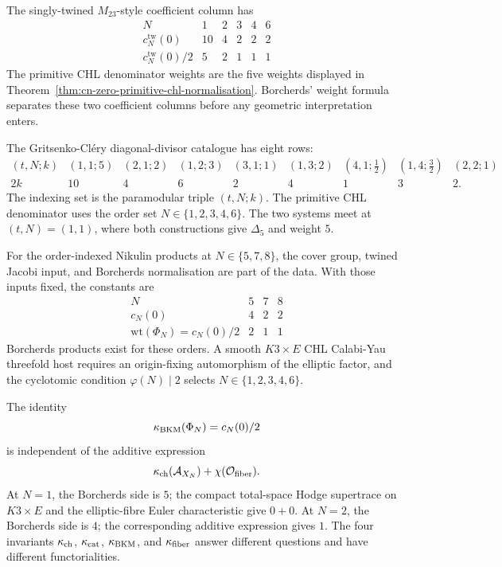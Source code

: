 \begin{remark}
\label{rem:cn-zero-coefficient-conventions-separated}
The singly-twined \(M_{23}\)-style coefficient column has
\[
\begin{array}{c|ccccc}
N & 1 & 2 & 3 & 4 & 6 \\ \hline
c_N^{\mathrm{tw}}(0) & 10 & 4 & 2 & 2 & 2 \\
c_N^{\mathrm{tw}}(0)/2 & 5 & 2 & 1 & 1 & 1
\end{array}
\]
The primitive CHL denominator weights are the five weights displayed in
Theorem~\ref{thm:cn-zero-primitive-chl-normalisation}.  Borcherds'
weight formula separates these two coefficient columns before any
geometric interpretation enters.

The Gritsenko-Cl\'ery diagonal-divisor catalogue has eight rows:
\[
\begin{array}{c|cccccccc}
(t,N;k) &
(1,1;5)&(2,1;2)&(1,2;3)&(3,1;1)&
(1,3;2)&(4,1;\tfrac12)&(1,4;\tfrac32)&(2,2;1)\\ \hline
2k & 10&4&6&2&4&1&3&2 .
\end{array}
\]
The indexing set is the paramodular triple \((t,N;k)\).  The primitive
CHL denominator uses the order set \(N\in\{1,2,3,4,6\}\).  The two
systems meet at \((t,N)=(1,1)\), where both constructions give
\(\Delta_5\) and weight \(5\).

For the order-indexed Nikulin products at \(N\in\{5,7,8\}\), the cover
group, twined Jacobi input, and Borcherds normalisation are part of the
data.  With those inputs fixed, the constants are
\[
\begin{array}{c|ccc}
N & 5 & 7 & 8 \\ \hline
c_N(0) & 4 & 2 & 2 \\
\mathrm{wt}(\Phi_N)=c_N(0)/2 & 2 & 1 & 1
\end{array}
\]
Borcherds products exist for these orders.  A smooth \(K3\times E\)
CHL Calabi-Yau threefold host requires an origin-fixing automorphism of
the elliptic factor, and the cyclotomic condition \(\varphi(N)\mid 2\)
selects \(N\in\{1,2,3,4,6\}\).
\end{remark}

\begin{remark}
\label{rem:cn-zero-four-invariant-discipline}
The identity
\[
  \kappa_{\mathrm{BKM}}(\Phi_N)=c_N(0)/2
\]
is independent of the additive expression
\[
  \kappa_{\mathrm{ch}}(\mathcal A_{X_N})+\chi(\mathcal{O}_{\mathrm{fiber}}).
\]
At \(N=1\), the Borcherds side is \(5\); the compact total-space Hodge
supertrace on \(K3\times E\) and the elliptic-fibre Euler characteristic
give \(0+0\).  At \(N=2\), the Borcherds side is \(4\); the corresponding
additive expression gives \(1\).  The four invariants \(\kappa_{\mathrm{ch}}\), \(\kappa_{\mathrm{cat}}\),
\(\kappa_{\mathrm{BKM}}\), and \(\kappa_{\mathrm{fiber}}\) answer different questions and have different
functorialities.
\end{remark}

